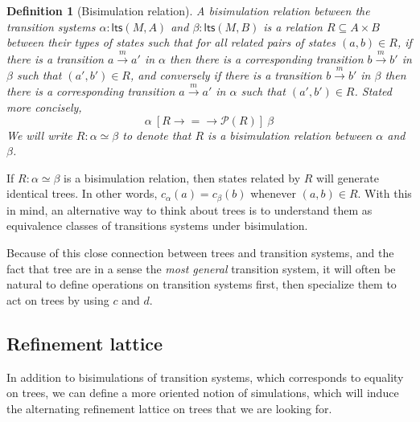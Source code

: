 \documentclass[11pt]{article}
\newcommand{\kw}[1]{{\mathsf{#1}}}
\newtheorem{definition}{Definition}
\begin{document}
\begin{definition}[Bisimulation relation]
A \emph{bisimulation relation} between the transition systems
$\alpha : \kw{lts}(M, A)$ and
$\beta : \kw{lts}(M, B)$
is a relation $R \subseteq A \times B$
between their types of states
such that for all related pairs of states $(a, b) \in R$,
if there is a transition
$a \stackrel{m}{\rightarrow} a'$ in $\alpha$
then there is a corresponding transition
$b \stackrel{m}{\rightarrow} b'$ in $\beta$
such that $(a', b') \in R$,
and conversely if there is a transition
$b \stackrel{m}{\rightarrow} b'$ in $\beta$
then there is a corresponding transition
$a \stackrel{m}{\rightarrow} a'$ in $\alpha$
such that $(a', b') \in R$.
Stated more concisely,
\[
  \alpha \: [R \rightarrow {=} \rightarrow \mathcal{P}(R)] \: \beta
\]
We will write $R : \alpha \simeq \beta$
to denote that $R$ is a bisimulation relation
between $\alpha$ and $\beta$.
\end{definition}

If $R : \alpha \simeq \beta$ is a bisimulation relation,
then states related by $R$ will generate identical trees.
In other words, $c_\alpha(a) = c_\beta(b)$ whenever $(a, b) \in R$.
With this in mind,
an alternative way to think about trees
is to understand them as equivalence classes
of transitions systems under bisimulation.

Because of this close connection between trees and transition systems,
and the fact that tree are in a sense
the \emph{most general} transition system,
it will often be natural to
define operations on transition systems first,
then specialize them to act on trees by using $c$ and $d$.

\subsection{Refinement lattice}

In addition to bisimulations of transition systems,
which corresponds to equality on trees,
we can define a more oriented notion of simulations,
which will induce the alternating refinement lattice on trees
that we are looking for.
\end{document}
